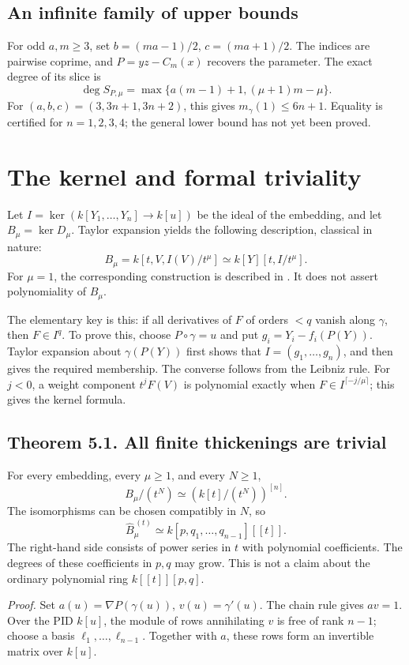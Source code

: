 \subsection*{An infinite family of upper bounds}
For odd $a,m\ge3$, set $b=(ma-1)/2$, $c=(ma+1)/2$. The indices are pairwise coprime, and $P=yz-C_m(x)$ recovers the parameter. The exact degree of its slice is
\[
\deg S_{P,\mu}=\max\{a(m-1)+1,(\mu+1)m-\mu\}.
\]
For $(a,b,c)=(3,3n+1,3n+2)$, this gives $m_\gamma(1)\le6n+1$. Equality is certified for $n=1,2,3,4$; the general lower bound has not yet been proved.

\section{The kernel and formal triviality}\label{sec:formal}
Let $I=\ker(k[Y_1,\ldots,Y_n]\to k[u])$ be the ideal of the embedding, and let $B_\mu=\ker D_\mu$. Taylor expansion yields the following description, classical in nature:
\[
\boxed{B_\mu=k[t,V,I(V)/t^\mu]\simeq k[Y][t,I/t^\mu].}
\]
For $\mu=1$, the corresponding construction is described in \cite[Proposition 5.4, Corollary 5.5]{vdER}. It does not assert polynomiality of $B_\mu$.

The elementary key is this: if all derivatives of $F$ of orders $<q$ vanish along $\gamma$, then $F\in I^q$. To prove this, choose $P\circ\gamma=u$ and put $g_i=Y_i-f_i(P(Y))$. Taylor expansion about $\gamma(P(Y))$ first shows that $I=(g_1,\ldots,g_n)$, and then gives the required membership. The converse follows from the Leibniz rule. For $j<0$, a weight component $t^jF(V)$ is polynomial exactly when $F\in I^{\lceil-j/\mu\rceil}$; this gives the kernel formula.

\subsection*{Theorem 5.1. All finite thickenings are trivial}
For every embedding, every $\mu\ge1$, and every $N\ge1$,
\[
\boxed{B_\mu/(t^N)\simeq(k[t]/(t^N))^{[n]}.}
\]
The isomorphisms can be chosen compatibly in $N$, so
\[
\boxed{\widehat B_\mu^{\,(t)}\simeq k[p,q_1,\ldots,q_{n-1}][[t]].}
\]
The right-hand side consists of power series in $t$ with polynomial coefficients. The degrees of these coefficients in $p,q$ may grow. This is not a claim about the ordinary polynomial ring $k[[t]][p,q]$.

\textit{Proof.} Set $a(u)=\nabla P(\gamma(u))$, $v(u)=\gamma'(u)$. The chain rule gives $a v=1$. Over the PID $k[u]$, the module of rows annihilating $v$ is free of rank $n-1$; choose a basis $\ell_1,\ldots,\ell_{n-1}$. Together with $a$, these rows form an invertible matrix over $k[u]$.

